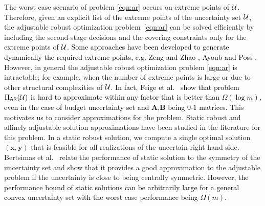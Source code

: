 \documentclass[11pt]{article}
\theoremstyle{plain}
\theoremstyle{definition}
\numberwithin{equation}{section}%
\numberwithin{equation}{section}%
\newcommand{\mb}[1]{\ensuremath{\boldsymbol{#1}}}
\newcommand*{\red}{\textcolor{black}}
\begin{document}
The worst case scenario of problem \eqref{eqn:ar} occurs on extreme points of ${\cal U}$. Therefore, given an explicit list of the extreme points of the uncertainty set ${\cal U}$, the adjustable robust optimization problem~\eqref{eqn:ar} can be solved efficiently by including the second-stage decisions and the covering constraints only for the extreme points of ${\cal U}$. \red{Some approaches have been developed to generate dynamically the required extreme points, e.g. Zeng and Zhao \cite{zeng2011solving}, Ayoub and Poss \cite{ayoub2016decomposition}.   } However, in general the adjustable robust optimization problem \eqref{eqn:ar} is intractable; for example, when the number of extreme points is large or due to other structural complexities of ${\cal U}$. \red{ In fact, Feige et al.~\cite{FJMM07} show that problem $\Pi_{\sf AR}({\cal U})$ is hard to approximate within any factor that is better than $\Omega(\log m)$, even in the case of budget uncertainty set and $\mb A$,$\mb B$ being $0$-$1$ matrices}. This motivates us to consider approximations for the problem. Static robust and affinely adjustable solution approximations have been studied in the literature for this problem. In a static robust solution, we compute a single optimal solution $(\mb{x},\mb{y})$ that is feasible for all realizations of the uncertain right hand side. Bertsimas et al.~\cite{BGS10}  relate the performance of static solution to the symmetry of the uncertainty set and show that it provides a good approximation to the adjustable problem if the uncertainty is close to being centrally symmetric. \red{However, the performance bound of static solutions can be arbitrarily large for a general convex uncertainty set with the worst case performance being $\Omega (m)$}.
\end{document}
